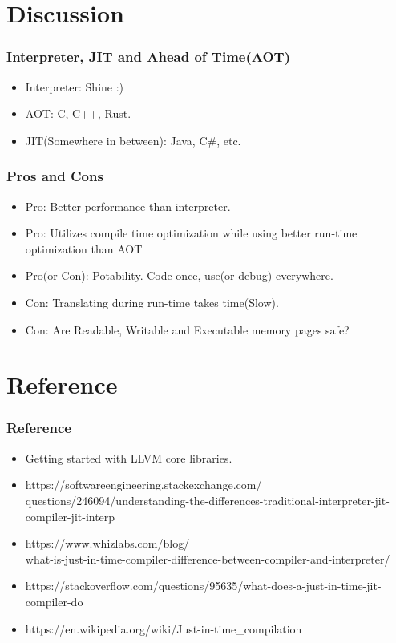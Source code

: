 \documentclass{beamer}
\begin{document}
\section{Discussion}

\begin{frame}
\frametitle{Interpreter, JIT and Ahead of Time(AOT)}
\begin{itemize}
	\item Interpreter: Shine :)
	\item AOT: C, C++, Rust.
	\item JIT(Somewhere in between): Java, C\#, etc.
\end{itemize}
\end{frame}

\begin{frame}
\frametitle{Pros and Cons}
\begin{itemize}
	\item Pro: Better performance than interpreter.
	\item Pro: Utilizes compile time optimization while using better run-time optimization than AOT
	\item Pro(or Con): Potability. Code once, use(or debug) everywhere.
	\item Con: Translating during run-time takes time(Slow).
	\item Con: Are Readable, Writable and Executable memory pages safe?
\end{itemize}
\end{frame}

\section{Reference}
\begin{frame}
\frametitle{Reference}
\begin{itemize}
	\item Getting started with LLVM core libraries.
	\item https://softwareengineering.stackexchange.com/\\questions/246094/understanding-the-differences-traditional-interpreter-jit-compiler-jit-interp
	\item https://www.whizlabs.com/blog/\\what-is-just-in-time-compiler-difference-between-compiler-and-interpreter/
	\item https://stackoverflow.com/questions/95635/what-does-a-just-in-time-jit-compiler-do
	\item https://en.wikipedia.org/wiki/Just-in-time\_compilation
\end{itemize}
\end{frame}
\end{document}
